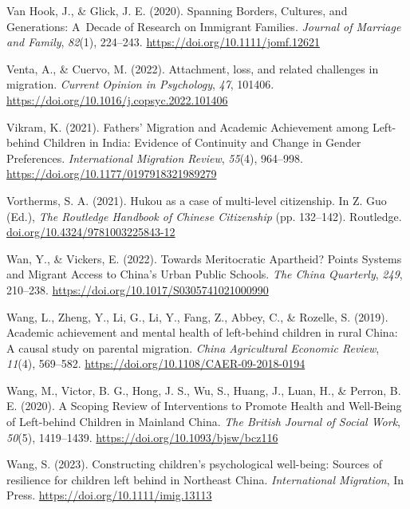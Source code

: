 \documentclass[
  man,floatsintext]{apa7}
\newlength{\cslhangindent}
\newlength{\cslentryspacingunit} %
\newenvironment{CSLReferences}[2] %
 {%
  \setlength{\parindent}{0pt}
  \ifodd #1
  \let\oldpar\par
  \def\par{\hangindent=\cslhangindent\oldpar}
  \fi
  \setlength{\parskip}{#2\cslentryspacingunit}
 }%
 {}
\begin{document}
\begin{CSLReferences}{1}{0}
\leavevmode{}%
Van Hook, J., \& Glick, J. E. (2020). Spanning Borders, Cultures, and Generations: A~Decade of Research on Immigrant Families. \emph{Journal of Marriage and Family}, \emph{82}(1), 224--243. \url{https://doi.org/10.1111/jomf.12621}

\leavevmode{}%
Venta, A., \& Cuervo, M. (2022). Attachment, loss, and related challenges in migration. \emph{Current Opinion in Psychology}, \emph{47}, 101406. \url{https://doi.org/10.1016/j.copsyc.2022.101406}

\leavevmode{}%
Vikram, K. (2021). Fathers{'} Migration and Academic Achievement among Left-behind Children in India: Evidence of Continuity and Change in Gender Preferences. \emph{International Migration Review}, \emph{55}(4), 964--998. \url{https://doi.org/10.1177/0197918321989279}

\leavevmode{}%
Vortherms, S. A. (2021). Hukou as a case of multi-level citizenship. In Z. Guo (Ed.), \emph{The Routledge Handbook of Chinese Citizenship} (pp. 132--142). Routledge. \href{https://doi.org/10.4324/9781003225843-12}{doi.org/10.4324/9781003225843-12}

\leavevmode{}%
Wan, Y., \& Vickers, E. (2022). Towards Meritocratic Apartheid? Points Systems and Migrant Access to {China}'s Urban Public Schools. \emph{The {China} Quarterly}, \emph{249}, 210--238. \url{https://doi.org/10.1017/S0305741021000990}

\leavevmode{}%
Wang, L., Zheng, Y., Li, G., Li, Y., Fang, Z., Abbey, C., \& Rozelle, S. (2019). Academic achievement and mental health of left-behind children in rural {China}: A causal study on parental migration. \emph{{China} Agricultural Economic Review}, \emph{11}(4), 569--582. \url{https://doi.org/10.1108/CAER-09-2018-0194}

\leavevmode{}%
Wang, M., Victor, B. G., Hong, J. S., Wu, S., Huang, J., Luan, H., \& Perron, B. E. (2020). A Scoping Review of Interventions to Promote Health and Well-Being of Left-behind Children in Mainland {China}. \emph{The British Journal of Social Work}, \emph{50}(5), 1419--1439. \url{https://doi.org/10.1093/bjsw/bcz116}

\leavevmode{}%
Wang, S. (2023). Constructing children's psychological well-being: Sources of resilience for children left behind in Northeast {China}. \emph{International Migration}, In Press. \url{https://doi.org/10.1111/imig.13113}


\end{CSLReferences}
\end{document}
